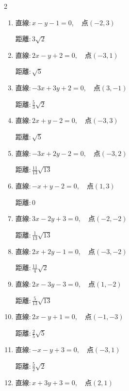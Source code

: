 \begin{multicols}{2}
\begin{enumerate}
        $\displaystyle 距離 : \frac{1}{4}\sqrt{2}$

  \item $直線:x-y-1=0,\quad 点 ( -2, 3 )$

        $\displaystyle 距離 : 3\sqrt{2}$

  \item $直線:2x-y+2=0,\quad 点 ( -3, 1 )$

        $\displaystyle 距離 : \sqrt{5}$

  \item $直線:-3x+3y+2=0,\quad 点 ( 3, -1 )$

        $\displaystyle 距離 : \frac{5}{3}\sqrt{2}$

  \item $直線:2x+y-2=0,\quad 点 ( -3, 3 )$

        $\displaystyle 距離 : \sqrt{5}$

\columnbreak %

\resetques

  \item $直線:-3x+2y-2=0,\quad 点 ( -3, 2 )$

        $\displaystyle 距離 : \frac{11}{13}\sqrt{13}$

  \item $直線:-x+y-2=0,\quad 点 ( 1, 3 )$

        $\displaystyle 距離 : 0$

  \item $直線:3x-2y+3=0,\quad 点 ( -2, -2 )$

        $\displaystyle 距離 : \frac{1}{13}\sqrt{13}$

  \item $直線:2x+2y-1=0,\quad 点 ( -3, -2 )$

        $\displaystyle 距離 : \frac{11}{4}\sqrt{2}$

  \item $直線:2x-3y-3=0,\quad 点 ( 1, -2 )$

        $\displaystyle 距離 : \frac{5}{13}\sqrt{13}$

  \item $直線:2x-y+1=0,\quad 点 ( -1, -3 )$

        $\displaystyle 距離 : \frac{2}{5}\sqrt{5}$

  \item $直線:-x-y+3=0,\quad 点 ( -3, 1 )$

        $\displaystyle 距離 : \frac{5}{2}\sqrt{2}$

  \item $直線:x+3y+3=0,\quad 点 ( 2, 1 )$


\end{enumerate}
\end{multicols}

